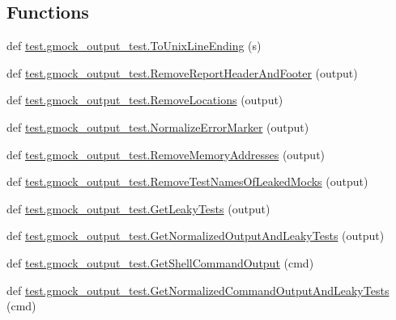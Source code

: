 \subsection*{Functions}
\begin{DoxyCompactItemize}
\item 
def \mbox{\hyperlink{namespacetest_1_1gmock__output__test_a5cb51fefbab49a4fb62a23598b534c68}{test.\+gmock\+\_\+output\+\_\+test.\+To\+Unix\+Line\+Ending}} (s)
\item 
def \mbox{\hyperlink{namespacetest_1_1gmock__output__test_a50061d02842fdef09ed5a2d6ac336721}{test.\+gmock\+\_\+output\+\_\+test.\+Remove\+Report\+Header\+And\+Footer}} (output)
\item 
def \mbox{\hyperlink{namespacetest_1_1gmock__output__test_acbc6816547709cddc5fe848ee9c29fee}{test.\+gmock\+\_\+output\+\_\+test.\+Remove\+Locations}} (output)
\item 
def \mbox{\hyperlink{namespacetest_1_1gmock__output__test_a878e940ca427748eb153497e91f31793}{test.\+gmock\+\_\+output\+\_\+test.\+Normalize\+Error\+Marker}} (output)
\item 
def \mbox{\hyperlink{namespacetest_1_1gmock__output__test_a31a24231c5eff18b7677b4959907caae}{test.\+gmock\+\_\+output\+\_\+test.\+Remove\+Memory\+Addresses}} (output)
\item 
def \mbox{\hyperlink{namespacetest_1_1gmock__output__test_a53eb65a752e79a04292ac20748b5186a}{test.\+gmock\+\_\+output\+\_\+test.\+Remove\+Test\+Names\+Of\+Leaked\+Mocks}} (output)
\item 
def \mbox{\hyperlink{namespacetest_1_1gmock__output__test_a7c968b78d8eafc2d63858ca517d74089}{test.\+gmock\+\_\+output\+\_\+test.\+Get\+Leaky\+Tests}} (output)
\item 
def \mbox{\hyperlink{namespacetest_1_1gmock__output__test_ae8399500a5863648c0a70676b9de2ccd}{test.\+gmock\+\_\+output\+\_\+test.\+Get\+Normalized\+Output\+And\+Leaky\+Tests}} (output)
\item 
def \mbox{\hyperlink{namespacetest_1_1gmock__output__test_ae7647061e8725a9c7222603df3ef1add}{test.\+gmock\+\_\+output\+\_\+test.\+Get\+Shell\+Command\+Output}} (cmd)
\item 
def \mbox{\hyperlink{namespacetest_1_1gmock__output__test_ab58dda81f004da854fad65bae2fdaff2}{test.\+gmock\+\_\+output\+\_\+test.\+Get\+Normalized\+Command\+Output\+And\+Leaky\+Tests}} (cmd)
\end{DoxyCompactItemize}
